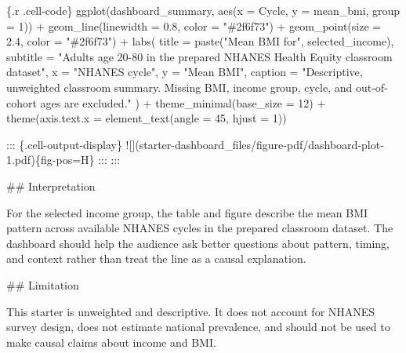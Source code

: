 \documentclass[
  letterpaper,
  DIV=11,
  numbers=noendperiod,
  oneside]{scrreprt}
\newenvironment{Shaded}{\begin{snugshade}}{\end{snugshade}}
\newcommand{\AlertTok}[1]{\textcolor[rgb]{0.68,0.00,0.00}{#1}}
\newcommand{\AttributeTok}[1]{\textcolor[rgb]{0.40,0.45,0.13}{#1}}
\newcommand{\DecValTok}[1]{\textcolor[rgb]{0.68,0.00,0.00}{#1}}
\newcommand{\FloatTok}[1]{\textcolor[rgb]{0.68,0.00,0.00}{#1}}
\newcommand{\FunctionTok}[1]{\textcolor[rgb]{0.28,0.35,0.67}{#1}}
\newcommand{\InformationTok}[1]{\textcolor[rgb]{0.37,0.37,0.37}{#1}}
\newcommand{\NormalTok}[1]{\textcolor[rgb]{0.00,0.23,0.31}{#1}}
\newcommand{\SpecialCharTok}[1]{\textcolor[rgb]{0.37,0.37,0.37}{#1}}
\newcommand{\StringTok}[1]{\textcolor[rgb]{0.13,0.47,0.30}{#1}}
\begin{document}
\begin{Shaded}
\begin{Highlighting}[numbers=left,,]
\InformationTok{\textasciigrave{}\textasciigrave{}\textasciigrave{}\{.r .cell{-}code\}}
\FunctionTok{ggplot}\NormalTok{(dashboard\_summary, }\FunctionTok{aes}\NormalTok{(}\AttributeTok{x =}\NormalTok{ Cycle, }\AttributeTok{y =}\NormalTok{ mean\_bmi, }\AttributeTok{group =} \DecValTok{1}\NormalTok{)) }\SpecialCharTok{+}
  \FunctionTok{geom\_line}\NormalTok{(}\AttributeTok{linewidth =} \FloatTok{0.8}\NormalTok{, }\AttributeTok{color =} \StringTok{"\#2f6f73"}\NormalTok{) }\SpecialCharTok{+}
  \FunctionTok{geom\_point}\NormalTok{(}\AttributeTok{size =} \FloatTok{2.4}\NormalTok{, }\AttributeTok{color =} \StringTok{"\#2f6f73"}\NormalTok{) }\SpecialCharTok{+}
  \FunctionTok{labs}\NormalTok{(}
    \AttributeTok{title =} \FunctionTok{paste}\NormalTok{(}\StringTok{"Mean BMI for"}\NormalTok{, selected\_income),}
    \AttributeTok{subtitle =} \StringTok{"Adults age 20{-}80 in the prepared NHANES Health Equity classroom dataset"}\NormalTok{,}
    \AttributeTok{x =} \StringTok{"NHANES cycle"}\NormalTok{,}
    \AttributeTok{y =} \StringTok{"Mean BMI"}\NormalTok{,}
    \AttributeTok{caption =} \StringTok{"Descriptive, unweighted classroom summary. Missing BMI, income group, cycle, and out{-}of{-}cohort ages are excluded."}
\NormalTok{  ) }\SpecialCharTok{+}
  \FunctionTok{theme\_minimal}\NormalTok{(}\AttributeTok{base\_size =} \DecValTok{12}\NormalTok{) }\SpecialCharTok{+}
  \FunctionTok{theme}\NormalTok{(}\AttributeTok{axis.text.x =} \FunctionTok{element\_text}\NormalTok{(}\AttributeTok{angle =} \DecValTok{45}\NormalTok{, }\AttributeTok{hjust =} \DecValTok{1}\NormalTok{))}
\InformationTok{\textasciigrave{}\textasciigrave{}\textasciigrave{}}

\NormalTok{::: \{.cell{-}output{-}display\}}
\AlertTok{![](starter{-}dashboard\_files/figure{-}pdf/dashboard{-}plot{-}1.pdf)}\NormalTok{\{fig{-}pos=\textquotesingle{}H\textquotesingle{}\}}
\NormalTok{:::}
\NormalTok{:::}


\FunctionTok{\#\# Interpretation}

\NormalTok{For the selected income group, the table and figure describe the mean BMI pattern across available NHANES cycles in the prepared classroom dataset. The dashboard should help the audience ask better questions about pattern, timing, and context rather than treat the line as a causal explanation.}

\FunctionTok{\#\# Limitation}

\NormalTok{This starter is unweighted and descriptive. It does not account for NHANES survey design, does not estimate national prevalence, and should not be used to make causal claims about income and BMI.}


\end{Highlighting}
\end{Shaded}
\end{document}
